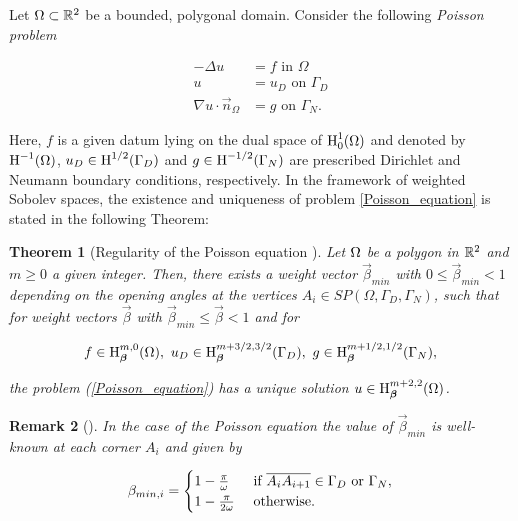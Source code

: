 \documentclass[a4paper,11pt]{article}
\newtheorem{theorem}{Theorem}
\newtheorem{remark}[theorem]{Remark}
\begin{document}
Let $\Omega \subset \mathbb R^{2}$ be a bounded, polygonal domain. Consider the following \textit{Poisson problem}

\begin{equation}\label{Poisson_equation}
\begin{split}
 - \Delta u &  = f  \text{ in } \Omega \\
u &  = u_{D} \text{ on } \Gamma_{D}\\
\nabla u \cdot \vec{n}_{\Omega} & = g \text{ on } \Gamma_{N}.
\end{split}
\end{equation}

Here, $f$ is a given datum lying on the dual space of $\operatorname H^{1}_0(\Omega)$ and denoted by $\operatorname H^{-1}(\Omega)$, $u_{D} \in \operatorname H^{1/2}(\Gamma_{D})$ and $ g \in \operatorname H^{-1/2}(\Gamma_{N})$ are prescribed Dirichlet and Neumann boundary conditions, respectively. In the framework of weighted Sobolev spaces, the existence and uniqueness of problem \eqref{Poisson_equation} is stated in the following Theorem:

\begin{theorem}[Regularity of the Poisson equation {\cite[Theorem 3.1]{BG:1988}}] \label{thm:regularity}
Let $\Omega$ be a polygon in $\mathbb R^2$ and $m \geq 0$ a given integer. Then, there exists a weight vector $\vec{\beta}_{min}$ with $0 \leq \vec{\beta}_{min} < 1$ depending on the opening angles at the vertices $A_{i} \in  \textit{SP}(\Omega,\Gamma_{D},\Gamma_{N})$, such that for weight vectors $\vec{\beta}$ with $\vec{\beta}_{min} \leq \vec{\beta} < 1$ and for 

$$ f \in  \operatorname H^{m,0}_{\boldsymbol \beta}(\Omega), \ u_{D} \in \operatorname H^{m + 3/2,3/2}_{\boldsymbol \beta}(\Gamma_{D}), \ g \in \operatorname H^{m+1/2,1/2}_{\boldsymbol \beta}(\Gamma_{N}),$$

the problem (\ref{Poisson_equation}) has a unique solution $u \in \operatorname H^{m+2,2}_{\boldsymbol \beta}(\Omega)$.    
\end{theorem}


\begin{remark}[{\cite[Theorem 2.1 - Remark 3]{BG:1988}}]
\label{remark:beta_value}
In the case of the Poisson equation the value of $\vec{\beta}_{min}$ is well-known at each corner $A_{i}$ and given by

\begin{equation}
    \beta_{min,i} = 
    \begin{cases}
        1 - \frac{\pi}{\omega} & \text{ if }  \overline{A_{i}A_{i+1}} \in \Gamma_{D} \text{ or }  \Gamma_{N},\\
        1 - \frac{\pi}{2\omega} & \text{ otherwise}.
    \end{cases}
\end{equation}
\end{remark}
\end{document}

